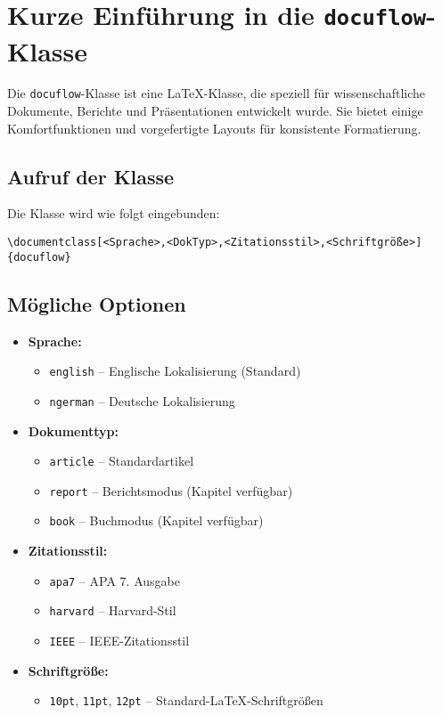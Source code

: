 
\section*{Kurze Einführung in die \texttt{docuflow}-Klasse}

Die \texttt{docuflow}-Klasse ist eine LaTeX-Klasse, die speziell für wissenschaftliche Dokumente, Berichte und Präsentationen entwickelt wurde. 
Sie bietet einige Komfortfunktionen und vorgefertigte Layouts für konsistente Formatierung.

\subsection*{Aufruf der Klasse}

Die Klasse wird wie folgt eingebunden:

\begin{verbatim}
\documentclass[<Sprache>,<DokTyp>,<Zitationsstil>,<Schriftgröße>]{docuflow}
\end{verbatim}

\subsection*{Mögliche Optionen}

\begin{itemize}
    \item \textbf{Sprache:} 
    \begin{itemize}
        \item \texttt{english} – Englische Lokalisierung (Standard)
        \item \texttt{ngerman} – Deutsche Lokalisierung
    \end{itemize}
    \item \textbf{Dokumenttyp:} 
    \begin{itemize}
        \item \texttt{article} – Standardartikel
        \item \texttt{report} – Berichtsmodus (Kapitel verfügbar)
        \item \texttt{book} – Buchmodus (Kapitel verfügbar)
    \end{itemize}
    \item \textbf{Zitationsstil:} 
    \begin{itemize}
        \item \texttt{apa7} – APA 7. Ausgabe
        \item \texttt{harvard} – Harvard-Stil
        \item \texttt{IEEE} – IEEE-Zitationsstil
    \end{itemize}
    \item \textbf{Schriftgröße:} 
    \begin{itemize}
        \item \texttt{10pt}, \texttt{11pt}, \texttt{12pt} – Standard-LaTeX-Schriftgrößen
    \end{itemize}
\end{itemize}

